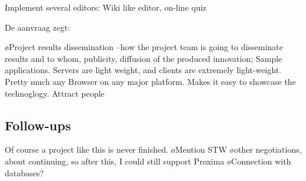 Implement several editors: Wiki like editor, on-line quiz

De aanvraag zegt:

\bl
\o Project results dissemination --how the project team is going to disseminate results and to whom, publicity, diffusion of the produced innovation;
\el
Sample applications. Servers are light weight, and clients are extremely light-weight. Pretty much any Browser on any major platform. Makes it easy to showcase the technoglogy. Attract people


\subsection{Follow-ups}

Of course a project like this is never finished.
\bl
\o Mention STW
\o other negotiations, about continuing, so after this, I could still support Proxima
\o Connection with databases?
\el

